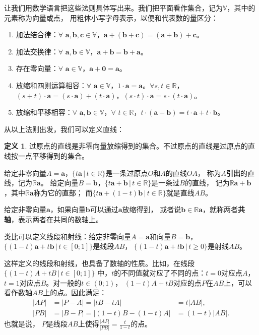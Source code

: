 \documentclass[12pt,UTF8]{ctexbook}
\theoremstyle{definition}
\newtheorem{df}{定义}[section]
\theoremstyle{plain}
\begin{document}
让我们用数学语言把这些法则具体写出来。我们把平面看作集合，记为$\mathbb{V}$，其中的元素称为向量或点，
用粗体小写字母表示，以便和代表数的量区分：
\begin{enumerate}
    \item 加法结合律：$\forall \,\, \mathbf{a}, \mathbf{b}, \mathbf{c} \in \mathbb{V}$，$\mathbf{a}+ (\mathbf{b} + \mathbf{c}) = (\mathbf{a} + \mathbf{b}) + \mathbf{c}$。
    \item 加法交换律：$\forall \,\, \mathbf{a}, \mathbf{b} \in \mathbb{V}$，$\mathbf{a} + \mathbf{b} = \mathbf{b} + \mathbf{a}$。
    \item 存在零向量：$\forall \,\, \mathbf{a} \in \mathbb{V}$，$\mathbf{a} + \mathbf{0} = \mathbf{a}$。
    \item 放缩和四则运算相容：$\forall \,\, \mathbf{a} \in \mathbb{V}$，$1\cdot \mathbf{a} = \mathbf{a}$。$\forall s, t \in \mathbb{R}$，$(s + t)\cdot\mathbf{a} = (s\cdot\mathbf{a}) + (t\cdot\mathbf{a})$，$(s \cdot t)\cdot \mathbf{a} = s \cdot (t\cdot \mathbf{a})$。
    \item 放缩和平移相容：$\forall \,\, \mathbf{a}, \mathbf{b} \in \mathbb{V}$，$\forall \,\, t \in \mathbb{R}$，$t\cdot(\mathbf{a} + \mathbf{b}) = t\cdot\mathbf{a} + t\cdot\mathbf{b}$。
\end{enumerate}

从以上法则出发，我们可以定义直线：
\begin{df}
    过原点的直线是非零向量放缩得到的集合。不过原点的直线是过原点的直线按一点平移得到的集合。
\end{df}
给定非零向量$A = \mathbf{a}$，$ \{t\mathbf{a} \, | \, t\in\mathbb{R}\}$是一条过原点$O$和$A$的直线$OA$，
称为$A$\textbf{引出}的直线，记为$\mathbb{R}\mathbf{a}$。
给定向量$B = \mathbf{b}$，$ \{t\mathbf{a}+\mathbf{b} \, | \, t\in\mathbb{R}\}$是一条过$B$的直线，
记为$\mathbb{R}\mathbf{a}+\mathbf{b}$，其中$\mathbb{R}\mathbf{a}$称为它的直部；
而$ \{t\mathbf{a}+(1 - t)\mathbf{b} \, | \, t\in\mathbb{R}\}$就是直线$AB$。

给定非零向量$\mathbf{a}$，如果向量$\mathbf{b}$可以通过$\mathbf{a}$放缩得到，
或者说$\mathbf{b}\in \mathbb{R}\mathbf{a}$，就称两者\textbf{共轴}，表示两者在共同的数轴上。

类比可以定义线段和射线：给定非零向量$A = \mathbf{a}$和向量$B =\mathbf{b}$，
$ \{(1 - t)\mathbf{a}+t\mathbf{b} \, | \, t\in [0; 1]\}$是线段$AB$，
$ \{(1 - t)\mathbf{a}+t\mathbf{b} \, | \, t \geqslant 0 \}$是射线$AB$。

这样定义的线段和射线，也具备了数轴的性质。比如，在线段$\{(1 - t)A+tB \, | \, t\in [0; 1]\}$
中，$t$的不同值就对应了不同的点：$t = 0$对应点$A$，$t=1$对应点$B$。对一般的$t\in (0;1)$，
$(1 - t)A+tB$对应的点$P$在$AB$上，可以看作数轴$AB$上的点。因此满足：
$$
\begin{array}{lll}
    |AP| &= |P - A| = |tB - tA| &= t|AB|, \\
    |PB| &= |B - P| = |(1 - t)B - (1 - t)A| &= (1 - t)|AB|.
\end{array}
$$
也就是说，
$P$是线段$AB$上使得$ \frac{|AP|}{|PB|} = \frac{t}{1 - t}$的点。
\end{document}
